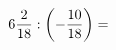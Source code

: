 \documentclass[preview]{standalone}
\begin{document}
\begin{align*}
6 { 2 \over 18 }  :  \left( - { 10 \over 18 } \right)  =
\end{align*}
\end{document}
